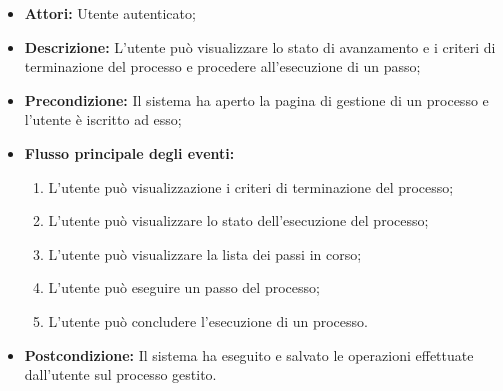 \begin{itemize}
\item \textbf{Attori:} Utente autenticato;
\item \textbf{Descrizione:} L'utente può visualizzare lo stato di avanzamento e i criteri di terminazione del processo e procedere all'esecuzione di un passo;
\item \textbf{Precondizione:} Il sistema ha aperto la pagina di gestione di un processo e l'utente è iscritto ad esso;
\item \textbf{Flusso principale degli eventi:}
\begin{enumerate}
\item L'utente può visualizzazione i criteri di terminazione del processo;
\item L'utente può visualizzare lo stato dell'esecuzione del processo;
\item L'utente può visualizzare la lista dei passi in corso;
\item L'utente può eseguire un passo del processo;
\item L'utente può concludere l'esecuzione di un processo.
\end{enumerate} 
\item \textbf{Postcondizione:} Il sistema ha eseguito e salvato le operazioni effettuate dall'utente sul processo gestito.
\end{itemize}

\hypertarget{L2.4.1}{}
